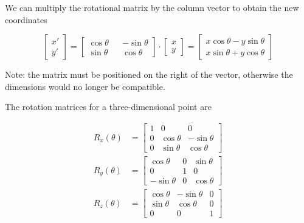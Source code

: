\documentclass[a4paper]{article}
\begin{document}
We can multiply the rotational matrix by the column vector to obtain the new coordinates

\[
    \begin{bmatrix} 
        x' \\
        y'
    \end{bmatrix}
    =
    \begin{bmatrix} 
        \cos\theta && -\sin\theta \\
        \sin\theta && \cos\theta
    \end{bmatrix}
    \cdot
    \begin{bmatrix} 
        x \\
        y
    \end{bmatrix}
    =
    \begin{bmatrix} 
        x\cos\theta - y\sin\theta \\
        x\sin\theta + y\cos\theta
    \end{bmatrix}
\]

Note: the matrix must be positioned on the right of the vector, otherwise the dimensions would no longer be compatible.

The rotation matrices for a three-dimensional point are

\begin{align*}
    R_x(\theta)&=
    \begin{bmatrix} 
        1 & 0 & 0 \\
        0 & \cos\theta & -\sin\theta \\
        0 & \sin\theta & \cos\theta
    \end{bmatrix}
    \\
    R_y(\theta)&=
    \begin{bmatrix} 
        \cos\theta & 0 & \sin\theta \\
        0 & 1 & 0 \\
        -\sin\theta & 0 & \cos\theta
    \end{bmatrix}
    \\
    R_z(\theta)&=
    \begin{bmatrix} 
        \cos\theta & -\sin\theta & 0 \\
        \sin\theta & \cos\theta & 0 \\
        0 & 0 & 1
    \end{bmatrix}
\end{align*}
\end{document}
